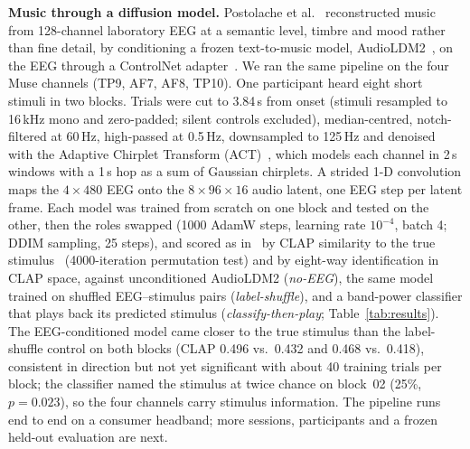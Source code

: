 \documentclass[conference]{IEEEtran}
\begin{document}
\textbf{Music through a diffusion model.} Postolache et al.~\cite{postolache2024naturalistic} reconstructed music from 128-channel laboratory EEG at a semantic level, timbre and mood rather than fine detail, by conditioning a frozen text-to-music model, AudioLDM2~\cite{liu2023audioldm2}, on the EEG through a ControlNet adapter~\cite{zhang2023controlnet}. We ran the same pipeline on the four Muse channels (TP9, AF7, AF8, TP10). One participant heard eight short stimuli in two blocks. Trials were cut to 3.84\,s from onset (stimuli resampled to 16\,kHz mono and zero-padded; silent controls excluded), median-centred, notch-filtered at 60\,Hz, high-passed at 0.5\,Hz, downsampled to 125\,Hz and denoised with the Adaptive Chirplet Transform (ACT)~\cite{mann1995chirplet, kumar2026act, mann2025sleep}, which models each channel in 2\,s windows with a 1\,s hop as a sum of Gaussian chirplets. A strided 1-D convolution maps the $4 \times 480$ EEG onto the $8 \times 96 \times 16$ audio latent, one EEG step per latent frame. Each model was trained from scratch on one block and tested on the other, then the roles swapped (1000 AdamW steps, learning rate $10^{-4}$, batch 4; DDIM sampling, 25 steps), and scored as in~\cite{postolache2024naturalistic} by CLAP similarity to the true stimulus~\cite{wu2023clap} (4000-iteration permutation test) and by eight-way identification in CLAP space, against unconditioned AudioLDM2 (\emph{no-EEG}), the same model trained on shuffled EEG--stimulus pairs (\emph{label-shuffle}), and a band-power classifier that plays back its predicted stimulus (\emph{classify-then-play}; Table~\ref{tab:results}). The EEG-conditioned model came closer to the true stimulus than the label-shuffle control on both blocks (CLAP 0.496 vs.\ 0.432 and 0.468 vs.\ 0.418), consistent in direction but not yet significant with about 40 training trials per block; the classifier named the stimulus at twice chance on block~02 (25\%, $p = 0.023$), so the four channels carry stimulus information. The pipeline runs end to end on a consumer headband; more sessions, participants and a frozen held-out evaluation are next.
\end{document}
